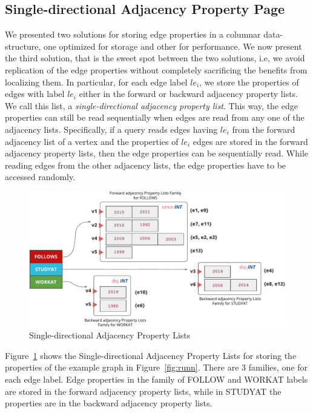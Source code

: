 \subsection{Single-directional Adjacency Property Page}

We presented two solutions for storing edge properties in a columnar data-structure, one optimized for storage and other for performance. We now present the third solution, that is the sweet spot between the two solutions, i.e, we avoid replication of the edge properties without completely sacrificing the benefits from localizing them. In particular, for each edge label $le_i$, we store the properties of edges with label $le_i$ either in the forward or backward adjacency property lists. We call this list, a \emph{single-directional adjacency property list}. This way, the edge properties can still be read sequentially when edges are read from any one of the adjacency lists.  Specifically, if a query reads edges having $le_i$ from the forward adjacency list of a vertex and the properties of $le_i$ edges are stored in the forward adjacency property lists, then the edge properties can be sequentially read. While reading edges from the other adjacency lists, the edge properties have to be accessed randomly.

\begin{figure}
	\vspace{-25pt}
	\hfill\includegraphics[scale=0.78]{img/single-dir-prop-list}\hspace*{\fill}
	\captionsetup{justification=centering}
	\caption{Single-directional Adjacency Property Lists}
	\label{fig:single-dir-prop-list}
	\vspace{0pt}
\end{figure}

Figure~\ref{fig:single-dir-prop-list} shows the Single-directional Adjacency Property Lists for storing the properties of the example graph in Figure~\ref{fig:runn}. There are 3 families, one for each edge label. Edge properties in the family of FOLLOW and WORKAT labels are stored in the forward adjacency property lists, while in STUDYAT the properties are in the backward adjacency property lists.

